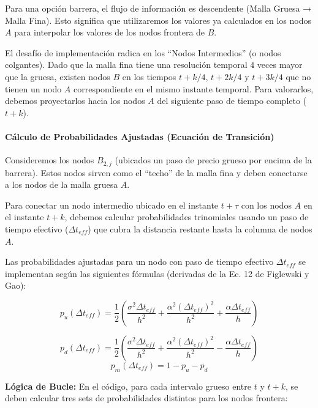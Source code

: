 Para una opción barrera, el flujo de información es descendente (Malla Gruesa → Malla Fina). Esto significa que utilizaremos los valores ya calculados en los nodos $A$ para interpolar los valores de los nodos frontera de $B$.

El desafío de implementación radica en los ``Nodos Intermedios'' (o nodos colgantes). Dado que la malla fina tiene una resolución temporal $4$ veces mayor que la gruesa, existen nodos $B$ en los tiempos $t+k/4$, $t+2k/4$ y $t+3k/4$ que no tienen un nodo $A$ correspondiente en el mismo instante temporal. Para valorarlos, debemos proyectarlos hacia los nodos $A$ del siguiente paso de tiempo completo ($t+k$).

\paragraph{Cálculo de Probabilidades Ajustadas (Ecuación de Transición)} 

Consideremos los nodos $B_{2,j}$ (ubicados un paso de precio grueso por encima de la barrera). Estos nodos sirven como el ``techo'' de la malla fina y deben conectarse a los nodos de la malla gruesa $A$.

Para conectar un nodo intermedio ubicado en el instante $t+\tau$ con los nodos $A$ en el instante $t+k$, debemos calcular probabilidades trinomiales usando un paso de tiempo efectivo ($\Delta t_{eff}$) que cubra la distancia restante hasta la columna de nodos $A$.

Las probabilidades ajustadas para un nodo con paso de tiempo efectivo $\Delta t_{eff}$ se implementan según las siguientes fórmulas (derivadas de la Ec. 12 de Figlewski y Gao):

\begin{equation} 
  p_u(\Delta t_{eff}) = \frac{1}{2} \left( \frac{\sigma^2 \Delta t_{eff}}{h^2} + \frac{\alpha^2 (\Delta t_{eff})^2}{h^2} + \frac{\alpha \Delta t_{eff}}{h} \right) 
\end{equation}

\begin{equation} 
  p_d(\Delta t_{eff}) = \frac{1}{2} \left( \frac{\sigma^2 \Delta t_{eff}}{h^2} + \frac{\alpha^2 (\Delta t_{eff})^2}{h^2} - \frac{\alpha \Delta t_{eff}}{h} \right) 
\end{equation}
\begin{equation} 
  p_m(\Delta t_{eff}) = 1 - p_u - p_d 
\end{equation}

\textbf{Lógica de Bucle:} En el código, para cada intervalo grueso entre $t$ y $t+k$, se deben calcular tres sets de probabilidades distintos para los nodos frontera: 

